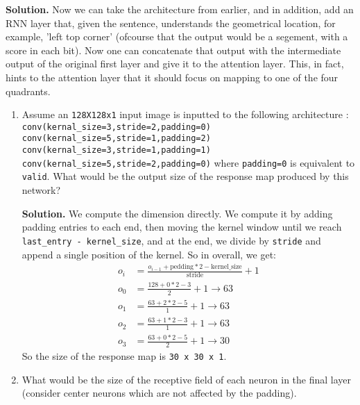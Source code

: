 \documentclass{article}
\begin{document}
\begin{enumerate}
\begin{enumerate}
        \textbf{Solution.} Now we can take the architecture from earlier, and in addition, add an RNN layer that, given the sentence, understands the geometrical location, for example, 'left top corner' (ofcourse that the output would be a segement, with a score in each bit). Now one can concatenate that output with the intermediate output of the original first layer and give it to the attention layer. This, in fact, hints to the attention layer that it should focus on mapping to one of the four quadrants.
    \end{enumerate}
    \begin{enumerate}
      \item Assume an \verb|128X128x1| input image is inputted to the following architecture :
\verb|conv(kernal_size=3,stride=2,padding=0)|
\verb|conv(kernal_size=5,stride=1,padding=2)|
\verb|conv(kernal_size=3,stride=1,padding=1)|
\verb|conv(kernal_size=5,stride=2,padding=0)|
where \verb|padding=0| is equivalent to \verb|valid|. What would be the output size of the response map produced by this network?
        

\textbf{Solution.} We compute the dimension directly. We compute it by adding padding entries to each end, then moving the kernel window until we reach \verb|last_entry - kernel_size|, and at the end, we divide by \verb|stride| and append a single position of the kernel. So in overall, we get:
\begin{equation*}
  \begin{split}
    o_i &= \frac{ o_{i-1} + \text{pedding} * 2 - \text{kernel_size}}{\text{stride} } +1 \\
      o_0 &=  \frac{  128 + 0 * 2 - 3}{2} + 1 \rightarrow 63  \\
      o_1 &=  \frac{ 63 + 2 * 2 - 5}{1} + 1 \rightarrow 63 \\
      o_2 &=  \frac{  63 + 1 * 2 - 3}{1} + 1\rightarrow 63 \\
      o_3 &=  \frac{  63 + 0 * 2 - 5}{2} + 1 \rightarrow 30 
    \end{split}
\end{equation*}
So the size of the response map is \verb|30 x 30 x 1|. 
\item What would be the size of the receptive field of each neuron in the final layer (consider center neurons which are not affected by the padding).


\end{enumerate}
\end{enumerate}
\end{document}
